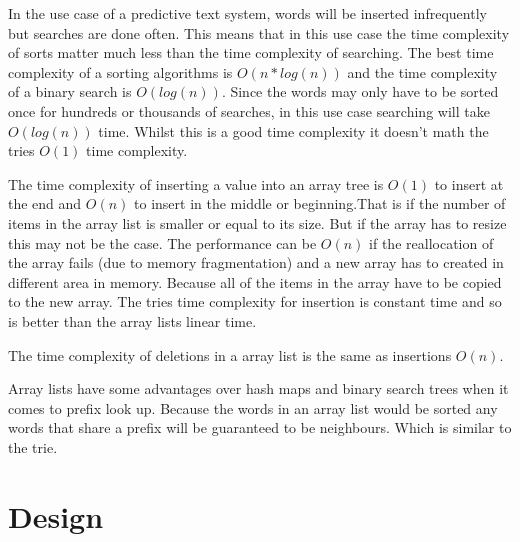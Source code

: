 \documentclass[10pt]{article} %
\begin{document}
			    In the use case of a predictive text system, words will be inserted infrequently but searches are done often. This means that in this use case the time complexity of sorts matter much less than the time complexity of searching. The best time complexity of a sorting algorithms is \begin{math} O(n * log(n)) \end{math} and the time complexity of a binary search is \begin{math}O(log(n))\end{math}. 
			    Since the words may only have to be sorted once for hundreds or thousands of searches, in this use case searching will take \begin{math}O(log(n))\end{math} time.
			    Whilst this is a good time complexity it doesn't math the tries \begin{math} O(1) \end{math} time complexity.
			    
			    The time complexity of inserting a value into an array tree is \begin{math}O(1)\end{math} to insert at the end and \begin{math}O(n)\end{math} to insert in the middle or beginning.That is if the number of items in the array list is smaller or equal to its size. But if the array has to resize this may not be the case. The performance can be \begin{math}O(n)\end{math} if the reallocation of the array fails (due to memory fragmentation) and a new array has to created in different area in memory. Because all of the items in the array have to be copied to the new array. 
			    The tries time complexity for insertion is constant time and so is better than the array lists linear time.
			
			    The time complexity of deletions in a array list is the same as insertions \begin{math}O(n)\end{math}.
			    
			    Array lists have some advantages over hash maps and binary search trees when it comes to prefix look up. Because the words in an array list would be sorted any words that share a prefix will be guaranteed to be neighbours. Which is similar to the trie.
    \section{Design}
\end{document}
